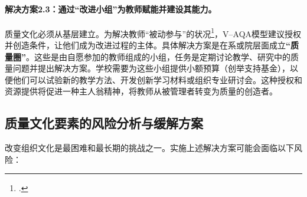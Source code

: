 \paragraph{解决方案2.3：通过“改进小组”为教师赋能并建设其能力。}
质量文化必须从基层建立。为解决教师“被动参与”的状况\footcite{iosr_passiveparticipation}，V--AQA模型建议授权并创造条件，让他们成为改进过程的主体。具体解决方案是在系或院层面成立\textbf{“质量圈”}。这些是由自愿参加的教师组成的小组，任务是定期讨论教学、研究中的质量问题并提出解决方案。学校需要为这些小组提供小额预算（创举支持基金），以便他们可以试验新的教学方法、开发创新学习材料或组织专业研讨会。这种授权和资源提供将促进一种主人翁精神，将教师从被管理者转变为质量的创造者。

\subsection{质量文化要素的风险分析与缓解方案}
\label{subsec:risk_vanhoa}
改变组织文化是最困难和最长期的挑战之一。实施上述解决方案可能会面临以下风险：

